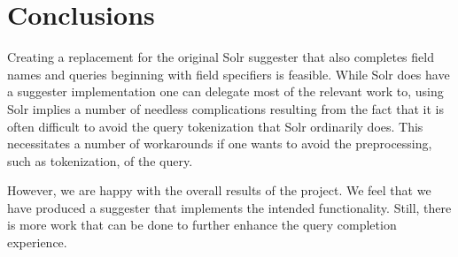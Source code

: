 \section{Conclusions}\label{conclusions}

Creating a replacement for the original Solr suggester that also completes field names and queries beginning with field specifiers is feasible. While Solr does have a suggester implementation one can delegate most of the relevant work to, using Solr implies a number of needless complications resulting from the fact that it is often difficult to avoid the query tokenization that Solr ordinarily does. This necessitates a number of workarounds if one wants to avoid the preprocessing, such as tokenization, of the query.

However, we are happy with the overall results of the project. We feel that we have produced a suggester that implements the intended functionality. Still, there is more work that can be done to further enhance the query completion experience.